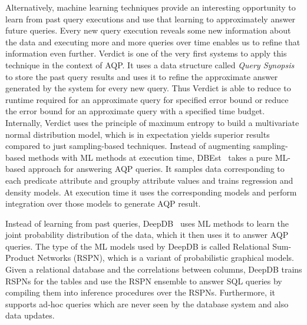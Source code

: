 Alternatively, machine learning techniques provide an interesting opportunity to learn from past query executions and use that learning to approximately answer future queries.
Every new query execution reveals some new information about the data and executing more and more queries over time enables us to refine that information even further.
Verdict \cite{verdict} is one of the very first systems to apply this technique in the context of AQP.
It uses a data structure called \textit{Query Synopsis} to store the past query results and uses it to refine the approximate answer generated by the system for every new query.
Thus Verdict is able to reduce to runtime required for an approximate query for specified error bound or reduce the error bound for an approximate query with a specified time budget.
Internally, Verdict uses the principle of maximum entropy to build a multivariate normal distribution model, which is in expectation yields superior results compared to just sampling-based techniques.
Instead of augmenting sampling-based methods with ML methods at execution time, DBEst~\cite{dbest} takes a pure ML-based approach for answering AQP queries.
It samples data corresponding to each predicate attribute and groupby attribute values and trains regression and density models.
At execution time it uses the corresponding models and perform integration over those models to generate AQP result.

Instead of learning from past queries, DeepDB~\cite{deepdb} uses ML methods to learn the joint probability distribution of the data, which it then uses it to answer AQP queries.
The type of the ML models used by DeepDB is called Relational Sum-Product Networks (RSPN), which is a variant of probabilistic graphical models.
Given a relational database and the correlations between columns, DeepDB trains RSPNs for the tables and use the RSPN ensemble to answer SQL queries by compiling them into inference procedures over the RSPNs.
Furthermore, it supports ad-hoc queries which are never seen by the database system and also data updates.














